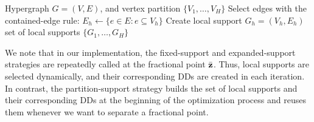 \begin{algorithm}[t]
\caption{\textsc{PartitionSupportStrategy}}
\label{alg:partition_support_mode}
\begin{algorithmic}[1]
\Require Hypergraph $G=(V,E)$, and  vertex partition $\{V_1,\ldots,V_H\}$
    \State Select edges with the contained-edge rule: $E_h\gets \{e\in E : e\subseteq V_h\}$
    \State Create local support $G_h =(V_h, E_h)$
\EndFor
\State \Return set of local supports $\{G_1,\ldots, G_H\}$
\end{algorithmic}
\end{algorithm}





\bigskip

We note that in our implementation, the fixed-support and expanded-support strategies are repeatedly called at the fractional point $\bar {\mathbf{z}}$. Thus, local supports are selected dynamically, and their corresponding DDs are created in each iteration. In contrast, the partition-support strategy builds the set of local supports and their corresponding DDs at the beginning of the optimization process and reuses them whenever we want to separate a fractional point. 
